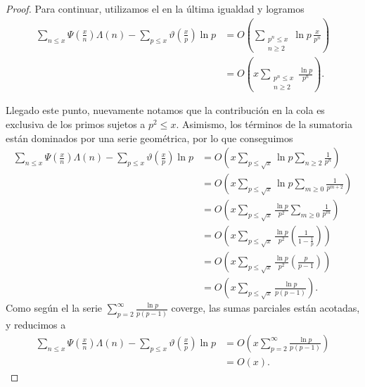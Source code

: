 \begin{proof}
Para continuar, utilizamos el  en la \'ultima igualdad y logramos 
\begin{align}
\sum_{n \leq x} \Psi\left(\frac{x}{n}\right)\Lambda(n) - \sum_{p \leq x} \vartheta\left(\frac{x}{p}\right)\ln p
&= O\left(\sum_{\substack{p^n \leq x \\ n \geq 2}} \ln p \, \frac{x}{p^n}\right) \\
&= O\left(x\sum_{\substack{p^n \leq x \\ n \geq 2}} \frac{\ln p}{p^n}\right).
\end{align}

Llegado este punto, nuevamente notamos que la contribuci\'on en la cola es exclusiva de los primos sujetos a $p^2 \le x$. 
Asimismo, los t\'erminos de la sumatoria est\'an dominados por una serie geom\'etrica, 
por lo que conseguimos 
\begin{align}
\sum_{n \leq x} \Psi\left(\frac{x}{n}\right)\Lambda(n) - \sum_{p \leq x} \vartheta\left(\frac{x}{p}\right)\ln p
&= O\left(x \sum_{p \leq \sqrt{x}} \ln p \sum_{n \geq 2} \frac{1}{p^n}\right) \\
%
&= O\left(x \sum_{p \leq \sqrt{x}} \ln p \sum_{m \geq 0} \frac{1}{p^{m + 2}}\right) \\
&= O\left(x \sum_{p \leq \sqrt{x}} \frac{\ln p}{p^2} \sum_{m \geq 0} \frac{1}{p^m}\right) \\
&= O\left(x \sum_{p \leq \sqrt{x}} \frac{\ln p}{p^2} \left(\frac{1}{1 - \frac{1}{p}}\right)\right) \\
&= O\left(x \sum_{p \leq \sqrt{x}} \frac{\ln p}{p^2} \left(\frac{p}{p - 1}\right)\right) \\
&= O\left(x \sum_{p \leq \sqrt{x}} \frac{\ln p}{p (p - 1)}\right).
\end{align}
Como seg\'un el  la serie $\displaystyle{\sum_{p = 2}^{\infty} \frac{\ln p}{p (p - 1)}}$ coverge, 
las sumas parciales est\'an acotadas, y reducimos a 
\begin{align}
\sum_{n \leq x} \Psi\left(\frac{x}{n}\right)\Lambda(n) - \sum_{p \leq x} \vartheta\left(\frac{x}{p}\right)\ln p
&= O\left(x \sum_{p = 2}^\infty \frac{\ln p}{p (p - 1)}\right) \\
&= O(x).
\end{align}


\end{proof}
